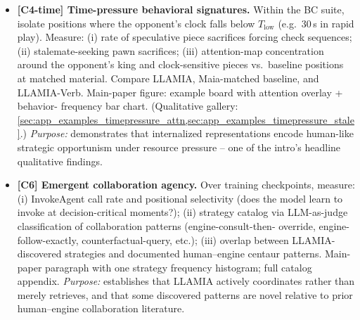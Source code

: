 \begin{itemize}[leftmargin=*]

    \item \textbf{[C4-time] Time-pressure behavioral signatures.}
    Within the BC suite, isolate positions where the opponent's clock
    falls below $T_{\text{low}}$ (e.g.\ 30\,s in rapid play).
    Measure: (i) rate of speculative piece sacrifices forcing check
    sequences; (ii) stalemate-seeking pawn sacrifices; (iii)
    attention-map concentration around the opponent's king and
    clock-sensitive pieces vs.\ baseline positions at matched material.
    Compare LLAMIA, Maia-matched baseline, and LLAMIA-Verb.
    Main-paper figure: example board with attention overlay + behavior-
    frequency bar chart. (Qualitative gallery: \cref{sec:app_examples_timepressure_attn,sec:app_examples_timepressure_stale}.)
    \emph{Purpose:} demonstrates that internalized representations
    encode human-like strategic opportunism under resource pressure --
    one of the intro's headline qualitative findings.

    \item \textbf{[C6] Emergent collaboration agency.}
    Over training checkpoints, measure: (i) InvokeAgent call rate and
    positional selectivity (does the model learn to invoke at
    decision-critical moments?); (ii) strategy catalog via LLM-as-judge
    classification of collaboration patterns (engine-consult-then-
    override, engine-follow-exactly, counterfactual-query, etc.);
    (iii) overlap between LLAMIA-discovered strategies and documented
    human--engine centaur patterns. Main-paper paragraph with one
    strategy frequency histogram; full catalog appendix.
    \emph{Purpose:} establishes that LLAMIA actively coordinates rather
    than merely retrieves, and that some discovered patterns are novel
    relative to prior human--engine collaboration literature.


\end{itemize}
